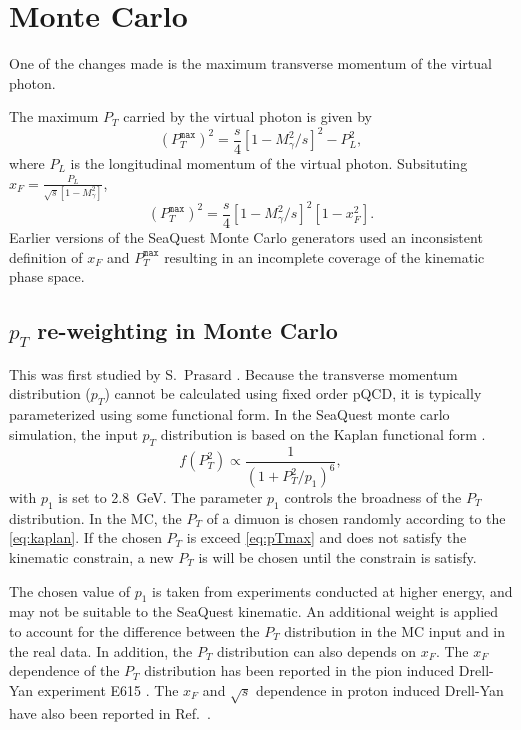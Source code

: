 \documentclass[../main.tex]{subfiles}
\begin{document}
\section{Monte Carlo}
\label{sec:MC}

One of the changes made is the maximum transverse momentum of the virtual photon.

The maximum $P_T$ carried by the virtual photon is given by
\begin{equation}
	\left(P_T^{\mathtt{max}}\right)^2 = \frac{s}{4} \left[1-M^2_\gamma/s\right]^2 - P_L^2,
\end{equation}
where $P_L$ is the longitudinal momentum of the virtual photon.
Subsituting $x_F = \frac{P_L}{\sqrt{s}\left[1-M^2_\gamma\right]}$,
\begin{equation}
	\left(P_T^{\mathtt{max}}\right)^2 = \frac{s}{4} \left[1-M^2_\gamma/s\right]^2\left[1-x_F^2\right].
	\label{eq:pTmax}
\end{equation}
Earlier versions of the SeaQuest Monte Carlo generators used an inconsistent definition of $x_F$
and $P_T^{\mathtt{max}}$ resulting in an incomplete coverage of the kinematic phase space.

\subsection{\texorpdfstring{$p_T$}{pT} re-weighting in Monte Carlo}
This was first studied by S.~Prasard \cite{prasad2020}.
Because the transverse momentum distribution ($p_T$) cannot be calculated using
fixed order pQCD, it is typically parameterized using some functional form.
In the SeaQuest monte carlo simulation, the input $p_T$ distribution is based on the
Kaplan functional form \cite{kaplan1978}.
\begin{equation}
	f\left(P_T^2\right) \propto \frac{1}{\left(1+ P_T^2/p_1\right)^6},
	\label{eq:kaplan}
\end{equation}
with $p_1$ is set to \SI{2.8}{\GeV}. The parameter $p_1$ controls the broadness
of the $P_T$ distribution. In the MC, the $P_T$ of a dimuon is chosen randomly
according to the \cref{eq:kaplan}. If the chosen $P_T$ is exceed \cref{eq:pTmax}
and does not satisfy the kinematic constrain, a new $P_T$ is will be chosen until
the constrain is satisfy.

The chosen value of $p_1$ is taken from experiments conducted at higher
energy, and may not be suitable to the SeaQuest kinematic. An additional weight is
applied to account for the difference between the $P_T$ distribution in the MC input
and in the real data. In addition, the $P_T$ distribution can also depends on $x_F$.
The $x_F$ dependence of the $P_T$ distribution has been reported in the pion induced
Drell-Yan experiment E615 \cite{conway1989}. The $x_F$ and $\sqrt{s}$ dependence in
proton induced Drell-Yan have also been reported in Ref.~\cite{prasad2020}.
\end{document}
